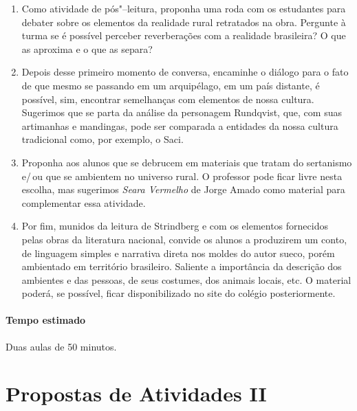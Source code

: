 \documentclass[12pt]{extarticle}
\begin{document}
\begin{enumerate}
\item
Como atividade de pós"--leitura, proponha uma roda com os estudantes para 
debater sobre os elementos da realidade rural retratados na obra. Pergunte 
à turma se é possível perceber reverberações com a realidade brasileira? 
O que as aproxima e o que as separa? 

\item
Depois desse primeiro momento de conversa, encaminhe o diálogo para o fato 
de que mesmo se passando em um arquipélago, em um país distante, é possível, 
sim, encontrar semelhanças com elementos de nossa cultura. 
Sugerimos que se parta da análise da personagem Rundqvist, que, com suas 
artimanhas e mandingas, pode ser comparada a entidades da nossa cultura 
tradicional como, por exemplo, o Saci. 

\item
Proponha aos alunos que se debrucem em materiais que tratam do
sertanismo e/\,ou que se ambientem no universo rural. 
O professor pode ficar livre nesta escolha, mas sugerimos 
\emph{Seara Vermelho} de Jorge Amado como material 
para complementar essa atividade. 

\item
Por fim, munidos da leitura de Strindberg e com os elementos fornecidos 
pelas obras da literatura nacional, convide os alunos a produzirem um 
conto, de linguagem simples e narrativa direta nos moldes do autor sueco, 
porém ambientado em território brasileiro. 
Saliente a importância da descrição dos ambientes e das pessoas, de seus 
costumes, dos animais locais, etc. O material poderá, se possível, ficar disponibilizado no site do colégio posteriormente.
\end{enumerate}

\paragraph{Tempo estimado} Duas aulas de 50 minutos.


\section{Propostas de Atividades II}

\end{document}
